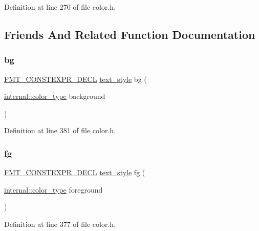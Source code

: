 Definition at line 270 of file color.\+h.



\subsection{Friends And Related Function Documentation}
\mbox{\label{classtext__style_a7eec86de8721ad96ef9b700d47f0d1e1}} 
\subsubsection{\texorpdfstring{bg}{bg}}
{\footnotesize\ttfamily \hyperlink{core_8h_af4388801466a5994a363d6005616371a}{F\+M\+T\+\_\+\+C\+O\+N\+S\+T\+E\+X\+P\+R\+\_\+\+D\+E\+CL} \hyperlink{classtext__style}{text\+\_\+style} bg (\begin{DoxyParamCaption}\item[{\hyperlink{structinternal_1_1color__type}{internal\+::color\+\_\+type}}]{background }\end{DoxyParamCaption})\hspace{0.3cm}{\ttfamily [friend]}}



Definition at line 381 of file color.\+h.

\mbox{\label{classtext__style_aba4da2dafd6afe1360a856a03db2eddd}} 
\subsubsection{\texorpdfstring{fg}{fg}}
{\footnotesize\ttfamily \hyperlink{core_8h_af4388801466a5994a363d6005616371a}{F\+M\+T\+\_\+\+C\+O\+N\+S\+T\+E\+X\+P\+R\+\_\+\+D\+E\+CL} \hyperlink{classtext__style}{text\+\_\+style} fg (\begin{DoxyParamCaption}\item[{\hyperlink{structinternal_1_1color__type}{internal\+::color\+\_\+type}}]{foreground }\end{DoxyParamCaption})\hspace{0.3cm}{\ttfamily [friend]}}



Definition at line 377 of file color.\+h.

\mbox{\label{classtext__style_ad91686b3587b1ed9a9066210ac5efa0d}} 
